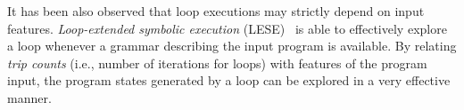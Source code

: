 It has been also observed that loop executions may strictly depend on input features. {\em Loop-extended symbolic execution} (LESE)~\cite{SPM-ISSTA09} is able to effectively explore a loop whenever a grammar describing the input program is available. By relating {\em trip counts} (i.e., number of iterations for loops) with features of the program input, the program states generated by a loop can be explored in a very effective manner.

